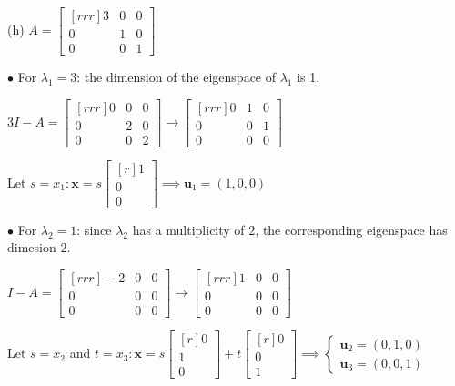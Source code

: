 \documentclass{article}
\begin{document}
    \begin{minipage}[t]{0.48\linewidth}
        (h) $A = \begin{bmatrix}[rrr]
            3 & 0 & 0 \\
            0 & 1 & 0 \\
            0 & 0 & 1 
        \end{bmatrix}$

        $\bullet$ For $ \lambda _1 = 3$: the dimension of the eigenspace of $ \lambda _1$ is 1.

        $3I - A = \begin{bmatrix}[rrr]
            0 & 0 & 0 \\
            0 & 2 & 0 \\
            0 & 0 & 2 
        \end{bmatrix} \to \begin{bmatrix}[rrr]
            0& 1 & 0 \\
            0 & 0 & 1 \\
            0 & 0 & 0 
        \end{bmatrix} $

        Let $s = x_1 : \textbf{x} = s \begin{bmatrix}[r]
            1 \\
            0 \\
            0 
        \end{bmatrix} \implies \textbf{u}_1 = (1,0,0)$

        $\bullet$ For $ \lambda _2 = 1$: since $ \lambda _2$ has a multiplicity of $2$, the corresponding eigenspace has dimesion $2$.

        $I - A = \begin{bmatrix}[rrr]
            -2 & 0 & 0 \\
            0 & 0 & 0 \\
            0 & 0 & 0 
        \end{bmatrix} \to \begin{bmatrix}[rrr]
            1 & 0 & 0 \\
             0  &0 &0 \\ 0& 0 & 0 
        \end{bmatrix} $

        Let $s = x_2$ and $t = x_3 : \textbf{x} = s \begin{bmatrix}[r]
            0\\
            1 \\
            0 
        \end{bmatrix} + t \begin{bmatrix}[r]
            0 \\
            0 \\
            1 
        \end{bmatrix} \implies \begin{cases}{}
            \textbf{u}_2 = (0,1,0) \\
            \textbf{u}_3 = (0,0,1)
        \end{cases}$
    \end{minipage}
\end{document}
